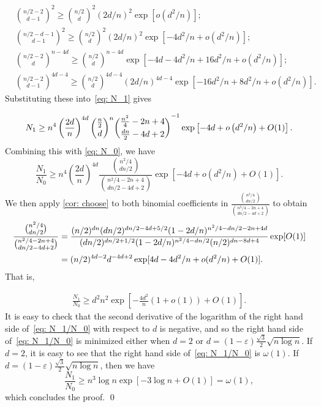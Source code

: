 \documentclass[11pt]{article}
\newcommand{\eps}{\varepsilon}
\theoremstyle{plain}
\begin{document}
{\allowdisplaybreaks \begin{align*}
    &\binom{n/2 - 2}{d - 1}^2 \geq \binom{n/2}{d}^2\left(2d/n\right)^{2}\exp[o(d^2/n)];\\
    &\binom{n/2 - d - 1}{d - 1}^2 \geq \binom{n/2}{d}^2(2d/n)^2\exp[-4d^2/n + o(d^2/n)];\\
    &\binom{n/2 - 2}{d}^{n - 4d} \geq \binom{n/2}{d}^{n-4d}\exp[-4d - 4d^2/n + 16d^2/n  + o(d^2/n)];\\
    &\binom{n/2 - 2}{d - 1}^{4d-4} \geq \binom{n/2}{d}^{4d-4}(2d/n)^{4d-4}\exp[-16d^2/n + 8d^2/n + o(d^2/n)].
\end{align*}}
Substituting these into~\eqref{eq: N_1} gives

\begin{equation}\notag
    N_1 \geq n^4 \left(\frac{2d}{n}\right)^{4d} \binom{\frac{n}{2}}{d}^n \binom{\frac{n^2}{4} - 2n + 4}{\frac{dn}{2} - 4d + 2}^{-1}\exp\left[-4d + o\left(d^2/{n}\right) + O(1)\right].
\end{equation}
Combining this with \eqref{eq: N_0}, we have 
\begin{equation*}
    \frac{N_1}{N_0} \geq n^4\left(\frac{2d}{n}\right)^{4d}\frac{\binom{n^2/4}{dn/2}}{\binom{n^2/4 - 2n + 4}{dn/2 - 4d + 2}}\exp[-4d + o(d^2/n) + O(1)].
\end{equation*}
We then apply \cref{cor: choose} to both binomial coefficients in $\frac{\binom{n^2/4}{dn/2}}{\binom{n^2/4 - 2n + 4}{dn/2 - 4d + 2}}$ to obtain
\begin{align}
    \frac{\binom{n^2/4}{dn/2}}{\binom{n^2/4 - 2n + 4}{dn/2 - 4d + 2}} &= \frac{(n/2)^{dn}(dn/2)^{dn/2 - 4d + 5/2}(1 - 2d/n)^{n^2/4 - dn/2 -2n + 4d}}{(dn/2)^{dn/2 + 1/2}(1 - 2d/n)^{n^2/4 - dn/2}(n/2)^{dn-8d + 4}}\exp[O(1)]\notag\\
    &=(n/2)^{4d-2}d^{-4d + 2}\exp[4d - 4d^2/n + o(d^2/n) + O(1)].\notag
\end{align}
That is, 

\begin{align}
    \frac{N_1}{N_0} \geq d^2n^2\exp\left[ -\frac{4d^2}{n}(1 + o(1)) + O(1)\right]. \label{eq: N_1/N_0}
\end{align}
It is easy to check that the second derivative of the logarithm of the right hand side of~\eqref{eq: N_1/N_0} with respect to $d$ is negative, and so the right hand side of~\eqref{eq: N_1/N_0} is minimized either when $d = 2$ or $d = (1 - \eps)\frac{\sqrt 3}{2}\sqrt{n\log n}$. If $d = 2$, it is easy to see that the right hand side of~\eqref{eq: N_1/N_0} is $\omega(1)$. If $d = (1 - \varepsilon)\frac{\sqrt 3}{2}\sqrt{n\log n}$, then we have
\[
\frac{N_1}{N_0} \geq n^3\log n \exp[-3\log n + O(1)] = \omega(1),
\]
which concludes the proof.
\qed
\end{document}

